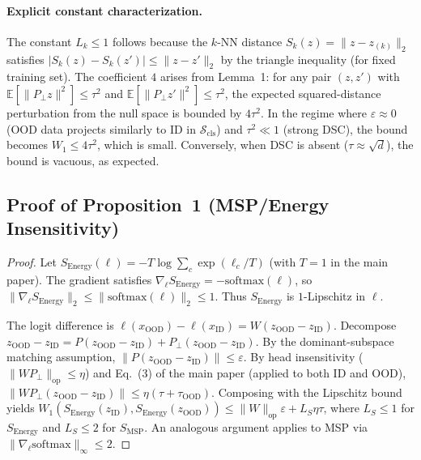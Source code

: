 \documentclass[runningheads]{llncs}
\begin{document}
\paragraph{Explicit constant characterization.}
The constant $L_k \le 1$ follows because the $k$-NN distance $S_k(z) = \|z - z_{(k)}\|_2$ satisfies
$|S_k(z) - S_k(z')| \le \|z - z'\|_2$ by the triangle inequality (for fixed training set).
The coefficient $4$ arises from Lemma~1: for any pair $(z, z')$ with
$\mathbb{E}[\|P_\perp z\|^2] \le \tau^2$ and $\mathbb{E}[\|P_\perp z'\|^2] \le \tau^2$,
the expected squared-distance perturbation from the null space is bounded by $4\tau^2$.
In the regime where $\varepsilon \approx 0$ (OOD data projects similarly to ID in $\mathcal{S}_{\mathrm{cls}}$)
and $\tau^2 \ll 1$ (strong DSC), the bound becomes $W_1 \le 4\tau^2$, which is small.
Conversely, when DSC is absent ($\tau \approx \sqrt{d}$), the bound is vacuous, as expected.

\subsection{Proof of Proposition~1 (MSP/Energy Insensitivity)}
\label{sec:supp:proof-prop1}

\begin{proof}
Let $S_{\mathrm{Energy}}(\ell) = -T\log\sum_{c}\exp(\ell_c/T)$ (with $T=1$ in the main
paper).
The gradient satisfies $\nabla_\ell S_{\mathrm{Energy}} = -\mathrm{softmax}(\ell)$,
so $\|\nabla_\ell S_{\mathrm{Energy}}\|_2 \le \|\mathrm{softmax}(\ell)\|_2 \le 1$.
Thus $S_{\mathrm{Energy}}$ is $1$-Lipschitz in $\ell$.

The logit difference is $\ell(x_{\mathrm{OOD}}) - \ell(x_{\mathrm{ID}}) = W(z_{\mathrm{OOD}} - z_{\mathrm{ID}})$.
Decompose $z_{\mathrm{OOD}} - z_{\mathrm{ID}} = P(z_{\mathrm{OOD}}-z_{\mathrm{ID}}) + P_\perp(z_{\mathrm{OOD}}-z_{\mathrm{ID}})$.
By the dominant-subspace matching assumption, $\|P(z_{\mathrm{OOD}}-z_{\mathrm{ID}})\| \le \varepsilon$.
By head insensitivity ($\|WP_\perp\|_{\mathrm{op}} \le \eta$) and Eq.~(3) of the main paper
(applied to both ID and OOD),
$\|WP_\perp(z_{\mathrm{OOD}}-z_{\mathrm{ID}})\| \le \eta(\tau + \tau_{\mathrm{OOD}})$.
Composing with the Lipschitz bound yields
$W_1(S_{\mathrm{Energy}}(z_{\mathrm{ID}}),S_{\mathrm{Energy}}(z_{\mathrm{OOD}}))
\le \|W\|_{\mathrm{op}}\varepsilon + L_S\eta\tau$,
where $L_S \le 1$ for $S_{\mathrm{Energy}}$ and $L_S \le 2$ for $S_{\mathrm{MSP}}$.
An analogous argument applies to MSP via
$\|\nabla_\ell\mathrm{softmax}\|_\infty \le 2$.
\end{proof}
\end{document}
